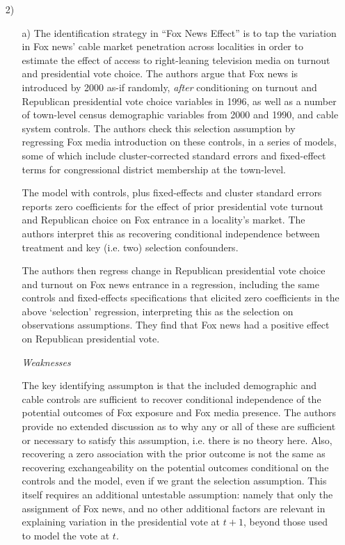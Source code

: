 \documentclass{article}
\begin{document}
\begin{itemize}
\begin{itemize}
    \end{itemize}
  \item[2)]
    \begin{itemize}
    \item[a)] The identification strategy in ``Fox News Effect'' is to
      tap the variation in Fox news' cable market penetration across
      localities in order to estimate the effect of access to
      right-leaning television media on turnout and presidential vote
      choice.  The authors argue that Fox news is introduced by 2000
      as-if randomly, {\em after} conditioning on turnout and
      Republican presidential vote choice variables in 1996, as well
      as a number of town-level census demographic variables from 2000
      and 1990, and cable system controls.  The authors check this
      selection assumption by regressing Fox media introduction on
      these controls, in a series of models, some of which include
      cluster-corrected standard errors and fixed-effect terms for
      congressional district membership at the town-level.
      \vspace{1em}

The model with controls, plus fixed-effects and cluster standard
errors reports zero coefficients for the effect of prior presidential
vote turnout and Republican choice on Fox entrance in a locality's
market.  The authors interpret this as recovering conditional
independence between treatment and key (i.e. two) selection confounders.
\vspace{1em}

The authors then regress change in Republican presidential vote choice
and turnout on Fox news entrance in a regression, including the same
controls and fixed-effects specifications that elicited zero
coefficients in the above `selection' regression, interpreting this as
the selection on observations assumptions.  They find that Fox news
had a positive effect on Republican presidential vote.
\vspace{1em}
\newpage

{\em Weaknesses}
\vspace{1em}

The key identifying assumpton is that the included demographic and
cable controls are sufficient to recover conditional independence of
the potential outcomes of Fox exposure and Fox media presence.  The
authors provide no extended discussion as to why any or all of these
are sufficient or necessary to satisfy this assumption, i.e. there is
no theory here.  Also, recovering a zero association with the prior
outcome is not the same as recovering exchangeability on the potential
outcomes conditional on the controls and the model, even if we grant
the selection assumption.  This itself requires an additional
untestable assumption: namely that only the assignment of Fox news,
and no other additional factors are relevant in explaining variation
in the presidential vote at $t+1$, beyond those used to model the vote
at $t$. 



\end{itemize}
\end{itemize}
\end{document}
